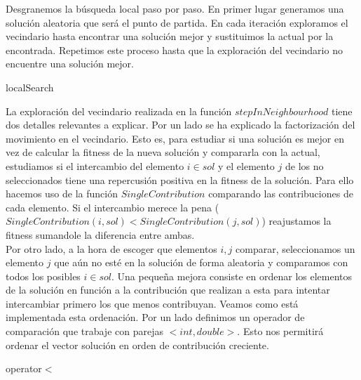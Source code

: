 \documentclass[11pt,a4paper]{article}
\begin{document}
	Desgranemos la búsqueda local paso por paso. En primer lugar generamos una solución aleatoria que será el punto de partida. En cada iteración exploramos el vecindario hasta encontrar una solución mejor y sustituimos la actual por la encontrada. Repetimos este proceso hasta que la exploración del vecindario no encuentre una solución mejor. \\
	
	\begin{algorithm}[H]
		\caption{localSearch}
	\end{algorithm}

	La exploración del vecindario realizada en la función $stepInNeighbourhood$ tiene dos detalles relevantes a explicar. Por un lado se ha explicado la factorización del movimiento en el vecindario. Esto es, para estudiar si una solución es mejor en vez de calcular la fitness de la nueva solución y compararla con la actual, estudiamos si el intercambio del elemento $i \in sol$ y el elemento $j$ de los no seleccionados tiene una repercusión positiva en la fitness de la solución. Para ello hacemos uso de la función $SingleContribution$ comparando las contribuciones de cada elemento. Si el intercambio merece la pena ($SingleContribution(i,sol) < SingleContribution(j,sol)$) reajustamos la fitness sumandole la diferencia entre ambas. \\
	
	Por otro lado, a la hora de escoger que elementos $i,j$ comparar, seleccionamos un elemento $j$ que aún no esté en la solución de forma aleatoria y comparamos con todos los posibles $i \in sol$. Una pequeña mejora consiste en ordenar los elementos de la solución en función a la contribución que realizan a esta para intentar intercambiar primero los que menos contribuyan. Veamos como está implementada esta ordenación. Por un lado definimos un operador de comparación que trabaje con parejas $<int, double>$. Esto nos permitirá ordenar el vector solución en orden de contribución creciente. \\
	
	\begin{algorithm}[H]
	 	\caption{operator$<$}
	\end{algorithm}
\end{document}
